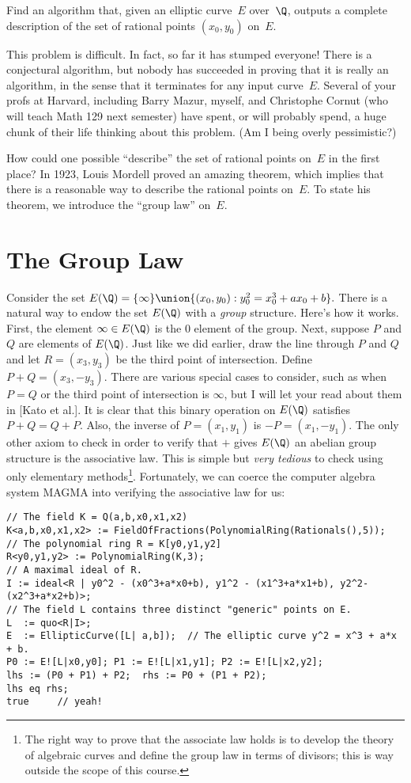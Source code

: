 \documentclass[11pt]{report}
\begin{document}
 Find an algorithm that, given
an elliptic curve~$E$ over~$\Q$, outputs a complete description
of the set of rational points $(x_0, y_0)$ on~$E$.

This problem is difficult.  In fact, so far it has stumped everyone!
There is a conjectural algorithm, but nobody has succeeded in proving
that it is really an algorithm, in the sense that it terminates for
any input curve~$E$.  Several of your profs at Harvard, including
Barry Mazur, myself, and Christophe Cornut (who will teach Math 129
next semester) have spent, or will probably spend, a huge chunk of
their life thinking about this problem. (Am I being overly pessimistic?)

How could one possible ``describe'' the set of rational points on~$E$
in the first place?  In 1923, Louis Mordell proved an amazing theorem,
which implies that there is a reasonable way to describe the rational
points on~$E$.  To state his theorem, we introduce the ``group law''
on~$E$.

\section{The Group Law}
Consider the set
$
  E(\Q) = \{\infty\} \union
  \{ (x_0, y_0) : y_0^2 = x_0^3 + ax_0 + b\}.
$
There is a natural way to endow the set $E(\Q)$ with a {\em group}
structure.  Here's how it works.  First, the element $\infty\in E(\Q)$
is the $0$ element of the group.  Next, suppose $P$ and $Q$ are elements of
$E(\Q)$.  Just like we did earlier, draw the line through $P$ and $Q$
and let $R=(x_3,y_3)$ be the third point of intersection.  Define
$
  P + Q = (x_3, -y_3).
$
There are various special cases to consider, such as when $P=Q$ or
the third point of intersection is $\infty$, but I will let your read about
them in [Kato et al.].  It is clear that this binary operation on $E(\Q)$
satisfies $P+Q = Q+P$.  Also, the inverse of $P=(x_1,y_1)$ is
$-P=(x_1,-y_1)$.  The only other axiom to check in order to
verify that $+$ gives $E(\Q)$ an abelian group structure is the associative
law.  This is simple but {\em very tedious} to check using only elementary
methods\footnote{The right way to prove that the associate law holds is to
  develop the theory of algebraic curves and define the group law in
  terms of divisors; this is way outside the scope of this course.}.
Fortunately, we can coerce the computer algebra system MAGMA
into verifying the associative law for us:
\begin{verbatim}
// The field K = Q(a,b,x0,x1,x2) 
K<a,b,x0,x1,x2> := FieldOfFractions(PolynomialRing(Rationals(),5));
// The polynomial ring R = K[y0,y1,y2]
R<y0,y1,y2> := PolynomialRing(K,3);
// A maximal ideal of R.
I := ideal<R | y0^2 - (x0^3+a*x0+b), y1^2 - (x1^3+a*x1+b), y2^2-(x2^3+a*x2+b)>;
// The field L contains three distinct "generic" points on E.
L  := quo<R|I>;
E  := EllipticCurve([L| a,b]);  // The elliptic curve y^2 = x^3 + a*x + b.
P0 := E![L|x0,y0]; P1 := E![L|x1,y1]; P2 := E![L|x2,y2];
lhs := (P0 + P1) + P2;  rhs := P0 + (P1 + P2);
lhs eq rhs;
true     // yeah!
\end{verbatim}
\end{document}
